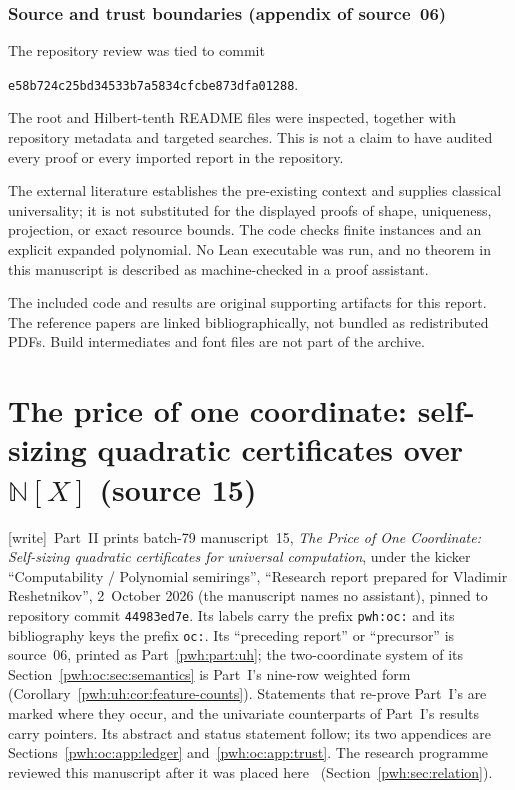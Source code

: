 \documentclass[11pt,letterpaper]{article}
\numberwithin{equation}{section}
\theoremstyle{definition}
\newcommand{\N}{\mathbb N}
\newcommand{\wtag}{\textup{[write]}}
\begin{document}
\section{Source and trust boundaries (appendix of source~06)}\label{pwh:uh:app:trust}

The repository review was tied to commit
\begin{center}
\small\texttt{e58b724c25bd34533b7a5834cfcbe873dfa01288}.
\end{center}
The root and Hilbert-tenth README files were inspected, together with
repository metadata and targeted searches. This is not a claim to have
audited every proof or every imported report in the repository.

The external literature establishes the pre-existing context and supplies
classical universality; it is not substituted for the displayed proofs of
shape, uniqueness, projection, or exact resource bounds. The code checks
finite instances and an explicit expanded polynomial. No Lean executable
was run, and no theorem in this manuscript is described as machine-checked
in a proof assistant.

The included code and results are original supporting artifacts for this
report. The reference papers are linked bibliographically, not bundled as
redistributed PDFs. Build intermediates and font files are not part of the
archive.


\part{The price of one coordinate: self-sizing quadratic certificates over \texorpdfstring{$\N[X]$}{N[X]} (source 15)}\label{pwh:part:oc}

\noindent\wtag\ Part~II prints batch-79 manuscript~15, \emph{The Price of
One Coordinate: Self-sizing quadratic certificates for universal
computation}, under the kicker ``Computability / Polynomial semirings'',
``Research report prepared for Vladimir Reshetnikov'', 2~October 2026 (the
manuscript names no assistant), pinned to repository commit
\texttt{44983ed7e}. Its labels carry the prefix \texttt{pwh:oc:} and its
bibliography keys the prefix \texttt{oc:}. Its ``preceding report'' or
``precursor'' is source~06, printed as Part~\ref{pwh:part:uh}; the
two-coordinate system of its Section~\ref{pwh:oc:sec:semantics} is
Part~I's nine-row weighted form (Corollary~\ref{pwh:uh:cor:feature-counts}).
Statements that re-prove Part~I's are marked where they occur, and the
univariate counterparts of Part~I's results carry pointers. Its abstract
and status statement follow; its two appendices are
Sections~\ref{pwh:oc:app:ledger} and~\ref{pwh:oc:app:trust}. The research
programme reviewed this manuscript after it was placed here~\cite{reviewOC}
(Section~\ref{pwh:sec:relation}).
\end{document}
